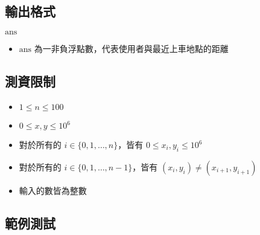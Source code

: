 \subsection{輸出格式}

\begin{format}
\f{
$\textrm{ans}$
}
\end{format}

\begin{itemize}
\tightlist
\item
  \begin{math}\textrm{ans}\end{math}
  為一非負浮點數，代表使用者與最近上車地點的距離
\end{itemize}

\subsection{測資限制}

\begin{itemize}
\tightlist
\item
  \begin{math}1 \le n \le 100\end{math}
\item
  \begin{math}0\le x, y\le10^6\end{math}
\item
  對於所有的 \begin{math}i\in\{0, 1, \ldots, n\}\end{math}，皆有
  \begin{math}0 \le x_i, y_i \le 10^6\end{math}
\item
  對於所有的 \begin{math}i\in\{0, 1, \ldots, n-1\}\end{math}，皆有
  \begin{math}(x_i, y_i)\ne(x_{i+1}, y_{i+1})\end{math}
\item
  輸入的數皆為整數
\end{itemize}

\subsection{範例測試}

\begin{example}
%
%
%
%
\end{example}

